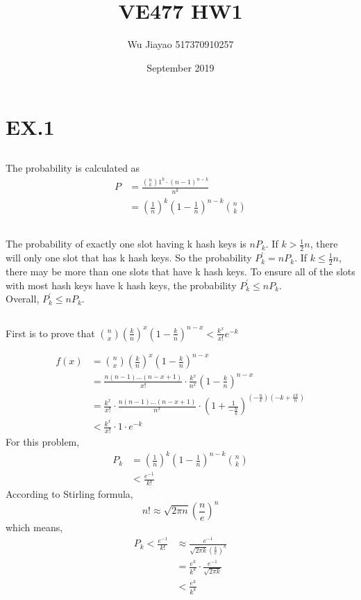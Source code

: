 \documentclass[12pt,a4paper]{article}
\title{VE477 HW1}
\author{Wu Jiayao 517370910257 }
\date{September 2019}
\theoremstyle{definition}
\begin{document}
\maketitle

\section{EX.1}
\subsection{}
	The probability is calculated as
	\begin{align*}
		P &= \frac{\binom{n}{k}1^k \cdot (n-1)^{n-k}}{n^k} \\
		& = (\frac{1}{n})^k(1-\frac{1}{n})^{n-k}\binom{n}{k}
	\end{align*}
\subsection{}
	The probability of exactly one slot having k hash keys is $nP_k$. If $k > \frac{1}{2}n$, there will only one slot that has k hash keys. So the probability $P_k^{'}=nP_k$. If $k \leq \frac{1}{2}n$, there may be more than one slots that have k hash keys. To ensure all of the slots with most hash keys have k hash keys, the probability $P_k^{'} \leq nP_k$.\\
	Overall, $P_k^{'} \leq nP_k$.
\subsection{}
	First is to prove that $\binom{n}{x}(\frac{k}{n})^x(1-\frac{k}{n})^{n-x} < \frac{k^x}{x!}e^{-k}$
	
	\begin{align*}
		f(x)&=\binom{n}{x}(\frac{k}{n})^x(1-\frac{k}{n})^{n-x}\\
		&=\frac{n(n-1)...(n-x+1)}{x!}\cdot\frac{k^x}{n^x}(1-\frac{k}{n})^{n-x}\\
		&=\frac{k^x}{x!}\cdot \frac{n(n-1)...(n-x+1)}{n^x} \cdot (1+\frac{1}{-\frac{n}{k}})^{(-\frac{n}{k})(-k+\frac{xk}{n})}\\
		&< \frac{k^x}{x!} \cdot 1 \cdot e^{-k}
	\end{align*}
	For this problem,
	\begin{align*}
		P_k & = (\frac{1}{n})^k(1-\frac{1}{n})^{n-k}\binom{n}{k} \\
			&<\frac{e^{-1}}{k!}
	\end{align*}
	According to Stirling formula,
	$$
		n! \approx \sqrt{2\pi n}(\frac{n}{e})^n
	$$
	which means,
	\begin{align*}
		P_k <\frac{e^{-1}}{k!} &\approx \frac{e^{-1}}{\sqrt{2\pi k}(\frac{k}{e})^k}\\
		&= \frac{e^k}{k^k} \cdot \frac{e^{-1}}{\sqrt{2\pi k}}\\
		&< \frac{e^k}{k^k}
	\end{align*}
\end{document}
